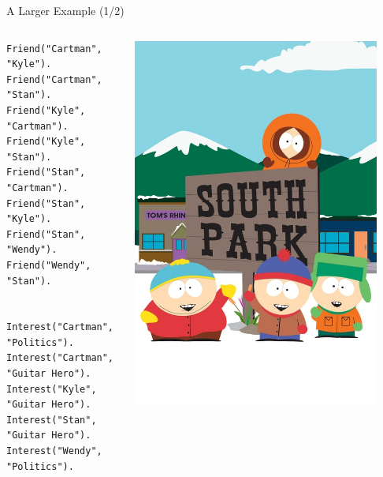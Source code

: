 \begin{frame}[fragile]{A Larger Example (1/2)}
\begin{columns}
\begin{column}{.65\textwidth}
\begin{lstlisting}[language=flix]
Friend("Cartman", "Kyle").
Friend("Cartman", "Stan").
Friend("Kyle", "Cartman").
Friend("Kyle", "Stan").
Friend("Stan", "Cartman").
Friend("Stan", "Kyle").
Friend("Stan", "Wendy").
Friend("Wendy", "Stan").


Interest("Cartman", "Politics").
Interest("Cartman", "Guitar Hero").
Interest("Kyle", "Guitar Hero").
Interest("Stan", "Guitar Hero").
Interest("Wendy", "Politics").
\end{lstlisting}
\end{column}
\begin{column}{.35\textwidth}
\begin{center}
\includegraphics[width=0.9\textwidth]{img/southpark.jpg}
\end{center}
\end{column}
\end{columns}
\end{frame}

